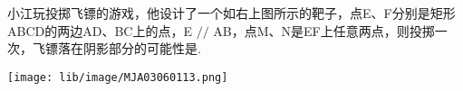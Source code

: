 小江玩投掷飞镖的游戏，他设计了一个如右上图所示的靶子，点E、F分别是矩形ABCD的两边AD、BC上的点，E $//$ AB，点M、N是EF上任意两点，则投掷一次，飞镖落在阴影部分的可能性是\key{\hspace{1cm}}.

\begin{center}

    \texttt{[image: lib/image/MJA03060113.png]}

\end{center}



